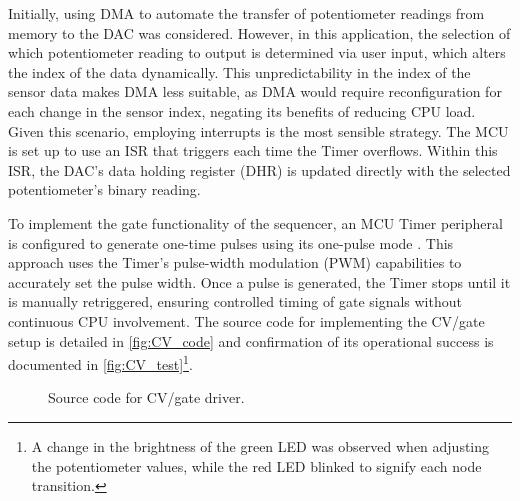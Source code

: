 \documentclass[12pt]{article}
\numberwithin{subsubsubsection}{subsubsection}
\begin{document}
Initially, using DMA to automate the transfer of potentiometer readings from memory to the DAC was considered. However, in this application, the selection of which potentiometer reading to output is determined via user input, which alters the index of the data dynamically. This unpredictability in the index of the sensor data makes DMA less suitable, as DMA would require reconfiguration for each change in the sensor index, negating its benefits of reducing CPU load.
Given this scenario, employing interrupts is the most sensible strategy. The MCU is set up to use an ISR that triggers each time the Timer overflows. Within this ISR, the DAC's data holding register (DHR) is updated directly with the selected potentiometer's binary reading. 

To implement the gate functionality of the sequencer, an MCU Timer peripheral is configured to generate one-time pulses using its one-pulse mode \cite{STM32_reference}. This approach uses the Timer’s pulse-width modulation (PWM) capabilities to accurately set the pulse width. Once a pulse is generated, the Timer stops until it is manually retriggered, ensuring controlled timing of gate signals without continuous CPU involvement. The source code for implementing the CV/gate setup is detailed in \autoref{fig:CV_code} and confirmation of its operational success is documented in \autoref{fig:CV_test}\footnote{A change in the brightness of the green LED was observed when adjusting the potentiometer values, while the red LED blinked to signify each node transition.}.


\begin{figure}[H]
    \centering
    \caption{Source code for CV/gate driver.}
    \label{fig:CV_code}
\end{figure}
\end{document}
